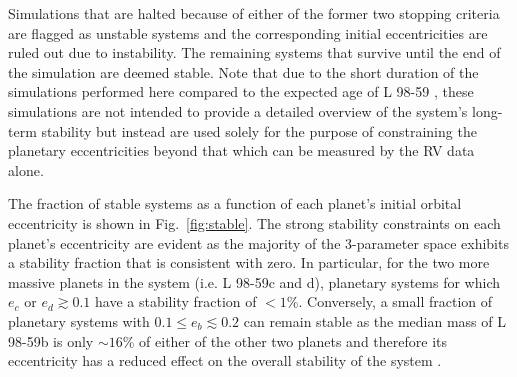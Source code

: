\documentclass[longauth]{aa}
\begin{document}
\noindent Simulations that are halted because of either of the former two stopping criteria are flagged as unstable systems and the corresponding initial eccentricities are ruled out due to instability. The remaining systems that survive until the end of the simulation are deemed stable. Note that due to the short duration of the simulations performed here compared to the expected age of L 98-59 , these simulations are not intended to provide a detailed overview of the system's long-term stability but instead are used solely for the purpose of constraining the planetary eccentricities beyond that which can be measured by the RV data alone.

The fraction of stable systems as a function of each planet's initial orbital eccentricity is shown in Fig.~\ref{fig:stable}. The strong stability constraints on each planet's eccentricity are evident as the majority of the 3-parameter space exhibits a stability fraction that is consistent with zero. In particular,
for the two more massive planets in the system (i.e. L 98-59c and d), planetary systems for which $e_c$ or $e_d \gtrsim 0.1$ have a stability fraction of $<1$\%. Conversely, a small fraction of planetary systems with $0.1 \leq e_b \lesssim 0.2$ can remain stable as the median mass of L 98-59b is only $\sim 16$\% of either of the other two planets and therefore its eccentricity has a reduced effect on the overall stability of the system \citep{barnes06}. 
\end{document}
